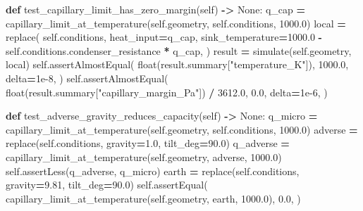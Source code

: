 \documentclass[
  12pt,a4paper,oneside]{report}
\newenvironment{Shaded}{\begin{snugshade}}{\end{snugshade}}
\newcommand{\BuiltInTok}[1]{#1}
\newcommand{\FloatTok}[1]{\textcolor[rgb]{0.00,0.00,0.81}{#1}}
\newcommand{\KeywordTok}[1]{\textcolor[rgb]{0.13,0.29,0.53}{\textbf{#1}}}
\newcommand{\NormalTok}[1]{#1}
\newcommand{\OperatorTok}[1]{\textcolor[rgb]{0.81,0.36,0.00}{\textbf{#1}}}
\newcommand{\StringTok}[1]{\textcolor[rgb]{0.31,0.60,0.02}{#1}}
\newcommand{\VariableTok}[1]{\textcolor[rgb]{0.00,0.00,0.00}{#1}}
\begin{document}
\begin{Shaded}
\begin{Highlighting}[]
    \KeywordTok{def}\NormalTok{ test\_capillary\_limit\_has\_zero\_margin(}\VariableTok{self}\NormalTok{) }\OperatorTok{{-}\textgreater{}} \VariableTok{None}\NormalTok{:}
\NormalTok{        q\_cap }\OperatorTok{=}\NormalTok{ capillary\_limit\_at\_temperature(}\VariableTok{self}\NormalTok{.geometry, }\VariableTok{self}\NormalTok{.conditions, }\FloatTok{1000.0}\NormalTok{)}
\NormalTok{        local }\OperatorTok{=}\NormalTok{ replace(}
            \VariableTok{self}\NormalTok{.conditions,}
\NormalTok{            heat\_input}\OperatorTok{=}\NormalTok{q\_cap,}
\NormalTok{            sink\_temperature}\OperatorTok{=}\FloatTok{1000.0} \OperatorTok{{-}} \VariableTok{self}\NormalTok{.conditions.condenser\_resistance }\OperatorTok{*}\NormalTok{ q\_cap,}
\NormalTok{        )}
\NormalTok{        result }\OperatorTok{=}\NormalTok{ simulate(}\VariableTok{self}\NormalTok{.geometry, local)}
        \VariableTok{self}\NormalTok{.assertAlmostEqual(}
            \BuiltInTok{float}\NormalTok{(result.summary[}\StringTok{"temperature\_K"}\NormalTok{]), }\FloatTok{1000.0}\NormalTok{, delta}\OperatorTok{=}\FloatTok{1e{-}8}\NormalTok{,}
\NormalTok{        )}
        \VariableTok{self}\NormalTok{.assertAlmostEqual(}
            \BuiltInTok{float}\NormalTok{(result.summary[}\StringTok{"capillary\_margin\_Pa"}\NormalTok{]) }\OperatorTok{/} \FloatTok{3612.0}\NormalTok{,}
            \FloatTok{0.0}\NormalTok{, delta}\OperatorTok{=}\FloatTok{1e{-}6}\NormalTok{,}
\NormalTok{        )}

    \KeywordTok{def}\NormalTok{ test\_adverse\_gravity\_reduces\_capacity(}\VariableTok{self}\NormalTok{) }\OperatorTok{{-}\textgreater{}} \VariableTok{None}\NormalTok{:}
\NormalTok{        q\_micro }\OperatorTok{=}\NormalTok{ capillary\_limit\_at\_temperature(}\VariableTok{self}\NormalTok{.geometry, }\VariableTok{self}\NormalTok{.conditions, }\FloatTok{1000.0}\NormalTok{)}
\NormalTok{        adverse }\OperatorTok{=}\NormalTok{ replace(}\VariableTok{self}\NormalTok{.conditions, gravity}\OperatorTok{=}\FloatTok{1.0}\NormalTok{, tilt\_deg}\OperatorTok{=}\FloatTok{90.0}\NormalTok{)}
\NormalTok{        q\_adverse }\OperatorTok{=}\NormalTok{ capillary\_limit\_at\_temperature(}\VariableTok{self}\NormalTok{.geometry, adverse, }\FloatTok{1000.0}\NormalTok{)}
        \VariableTok{self}\NormalTok{.assertLess(q\_adverse, q\_micro)}
\NormalTok{        earth }\OperatorTok{=}\NormalTok{ replace(}\VariableTok{self}\NormalTok{.conditions, gravity}\OperatorTok{=}\FloatTok{9.81}\NormalTok{, tilt\_deg}\OperatorTok{=}\FloatTok{90.0}\NormalTok{)}
        \VariableTok{self}\NormalTok{.assertEqual(}
\NormalTok{            capillary\_limit\_at\_temperature(}\VariableTok{self}\NormalTok{.geometry, earth, }\FloatTok{1000.0}\NormalTok{), }\FloatTok{0.0}\NormalTok{,}
\NormalTok{        )}


\end{Highlighting}
\end{Shaded}
\end{document}
